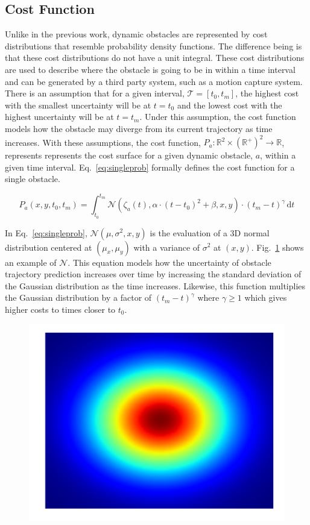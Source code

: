 \subsection{Cost Function}

\label{sec:cost}

Unlike in the previous work, dynamic obstacles are represented by cost
distributions that resemble probability density functions. The difference being
is that these cost distributions do not have a unit integral. These cost
distributions are used to describe where the obstacle is going to be in within
a time interval and can be generated by a third party system, such as a motion
capture system. There is an assumption that for a given interval, $\mathcal{T}
= [t_0, t_m]$, the highest cost with the smallest uncertainty will be at $t =
t_0$ and the lowest cost with the highest uncertainty will be at $t = t_m$.
Under this assumption, the cost function models how the obstacle may diverge
from its current trajectory as time increases. With these assumptions, the cost
function, $P_a: \mathbb{R}^2 \times (\mathbb{R}^+)^2 \rightarrow
\mathbb{R}$, represents represents the cost surface for a given dynamic
obstacle, $a$,  within a given time interval. Eq.~\ref{eq:singleprob} formally
defines the cost function for a single obstacle.


\begin{equation}
    P_a(x, y, t_0, t_m) = \int^{t_m}_{t_0}
    \mathcal{N}(\zeta_a(t), \alpha \cdot (t - t_0)^2 + \beta, x, y) \cdot
    (t_m - t)^{\gamma} \,\mathrm{d}t
    \label{eq:singleprob}
\end{equation}

In Eq.~\ref{eq:singleprob}, $\mathcal{N}(\mu, \sigma^2, x, y)$ is the
evaluation of a 3D normal distribution centered at $(\mu_x, \mu_y)$ with a
variance of $\sigma^2$ at $(x, y)$. Fig.~\ref{fig:normal_3d} shows an example
of $\mathcal{N}$. This equation models how the uncertainty of obstacle
trajectory prediction increases over time by increasing the standard deviation
of the Gaussian distribution as the time increases.  Likewise, this function
multiplies the Gaussian distribution by a factor of $(t_m - t)^{\gamma}$ where
$\gamma \geq 1$ which gives higher costs to times closer to $t_0$.

\begin{figure}[h!]
    \centering
    \includegraphics[width=0.60\linewidth]{figs/normal_3d}
    \caption{}
    \label{fig:normal_3d}
\end{figure}

